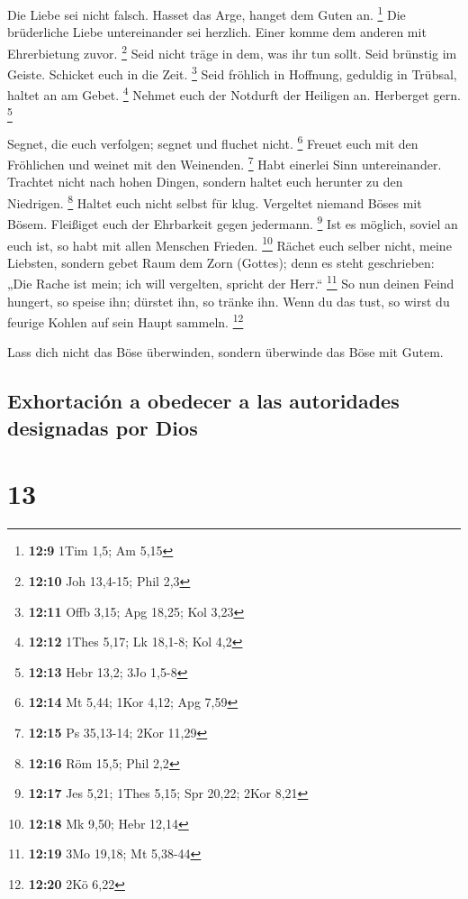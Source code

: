  Die Liebe sei nicht falsch. Hasset das Arge, hanget dem
Guten an. \footnote{\textbf{12:9} 1Tim 1,5; Am 5,15}  Die
brüderliche Liebe untereinander sei herzlich. Einer komme dem anderen
mit Ehrerbietung zuvor. \footnote{\textbf{12:10} Joh 13,4-15; Phil 2,3}
 Seid nicht träge in dem, was ihr tun sollt. Seid
brünstig im Geiste. Schicket euch in die Zeit. \footnote{\textbf{12:11}
  Offb 3,15; Apg 18,25; Kol 3,23}  Seid fröhlich in
Hoffnung, geduldig in Trübsal, haltet an am Gebet. \footnote{\textbf{12:12}
  1Thes 5,17; Lk 18,1-8; Kol 4,2}  Nehmet euch der
Notdurft der Heiligen an. Herberget gern. \footnote{\textbf{12:13} Hebr
  13,2; 3Jo 1,5-8}

 Segnet, die euch verfolgen; segnet und fluchet nicht.
\footnote{\textbf{12:14} Mt 5,44; 1Kor 4,12; Apg 7,59} 
Freuet euch mit den Fröhlichen und weinet mit den Weinenden. \footnote{\textbf{12:15}
  Ps 35,13-14; 2Kor 11,29}  Habt einerlei Sinn
untereinander. Trachtet nicht nach hohen Dingen, sondern haltet euch
herunter zu den Niedrigen. \footnote{\textbf{12:16} Röm 15,5; Phil 2,2}
 Haltet euch nicht selbst für klug. Vergeltet niemand
Böses mit Bösem. Fleißiget euch der Ehrbarkeit gegen jedermann.
\footnote{\textbf{12:17} Jes 5,21; 1Thes 5,15; Spr 20,22; 2Kor 8,21}
 Ist es möglich, soviel an euch ist, so habt mit allen
Menschen Frieden. \footnote{\textbf{12:18} Mk 9,50; Hebr 12,14}
 Rächet euch selber nicht, meine Liebsten, sondern gebet
Raum dem Zorn (Gottes); denn es steht geschrieben: „Die Rache ist mein;
ich will vergelten, spricht der Herr.`` \footnote{\textbf{12:19} 3Mo
  19,18; Mt 5,38-44}  So nun deinen Feind hungert, so
speise ihn; dürstet ihn, so tränke ihn. Wenn du das tust, so wirst du
feurige Kohlen auf sein Haupt sammeln. \footnote{\textbf{12:20} 2Kö 6,22}

 Lass dich nicht das Böse überwinden, sondern überwinde
das Böse mit Gutem.

\hypertarget{exhortaciuxf3n-a-obedecer-a-las-autoridades-designadas-por-dios}{%
\subsection{Exhortación a obedecer a las autoridades designadas por
Dios}\label{exhortaciuxf3n-a-obedecer-a-las-autoridades-designadas-por-dios}}

\hypertarget{section-12}{%
\section{13}\label{section-12}}

